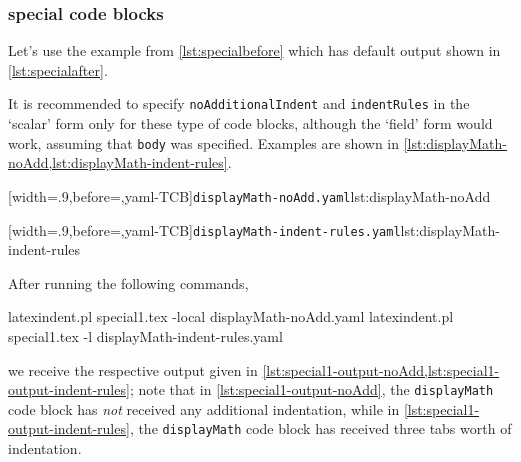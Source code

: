 \subsubsection{special code blocks}
Let's use the example from \vref{lst:specialbefore} which has default output shown in
\vref{lst:specialafter}.

It is recommended to specify \texttt{noAdditionalIndent} and \texttt{indentRules} in the `scalar' form only 
for these type of code blocks, although the `field' form would work, assuming that \texttt{body} was specified.
Examples are shown in \cref{lst:displayMath-noAdd,lst:displayMath-indent-rules}.

\begin{minipage}{.49\textwidth}
[width=.9\linewidth,before=\centering,yaml-TCB]{\texttt{displayMath-noAdd.yaml}}{lst:displayMath-noAdd}
\end{minipage}
\hfill
\begin{minipage}{.49\textwidth}
[width=.9\linewidth,before=\centering,yaml-TCB]{\texttt{displayMath-indent-rules.yaml}}{lst:displayMath-indent-rules}
\end{minipage}

After running the following commands,
\begin{commandshell}
latexindent.pl special1.tex -local displayMath-noAdd.yaml  
latexindent.pl special1.tex -l displayMath-indent-rules.yaml  
\end{commandshell}
we receive the respective output given in \cref{lst:special1-output-noAdd,lst:special1-output-indent-rules}; note that 
in \cref{lst:special1-output-noAdd}, the \texttt{displayMath} code block has \emph{not} received any additional indentation, 
while in \cref{lst:special1-output-indent-rules}, the \texttt{displayMath} code block has received three tabs worth of indentation.

\begin{minipage}{.45\textwidth}
\end{minipage}
\hfill
\begin{minipage}{.45\textwidth}
\end{minipage}

